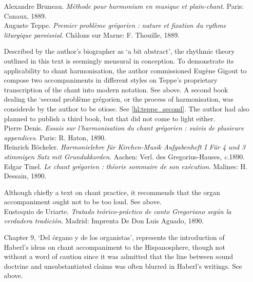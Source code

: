    \parindent=0pt
    \hangindent=0pt
  \covid{}Alexandre Bruneau. \emph{Méthode pour harmonium en musique et plain-chant}. Paris:  Canaux, 1889. \\

    \parindent=0pt
    \hangindent=0pt
  Auguste Teppe. \emph{Premier problème grégorien : nature et fixation du rythme liturgique paroissial}. Châlons sur Marne:  F. Thouille, 1889.

     \parindent=20pt
     \hangindent=20pt
     Described by the author's biographer as `a bit abstract', the rhythmic theory outlined in this text is seemingly mensural in conception. To demonstrate its applicability to chant harmonisation, the author commissioned Eugène Gigout to compose two accompaniments in different styles on Teppe's proprietary transcription of the chant into modern notation. See  above. A second book dealing the `second problème grégorien, or the process of harmonisation, was considerde by the author to be otiose. See \cref{hl:teppe_second}. The author had also planned to publish a third book, but that did not come to light either.\\

    \parindent=0pt
    \hangindent=0pt
  \covid{}Pierre Denis. \emph{Essais sur l'harmonisation du chant grégorien : suivis de plusieurs appendices}. Paris:  R. Haton, 1890. \\

    \parindent=0pt
    \hangindent=0pt
  \covid{}Heinrich Böckeler. \emph{Harmonielehre für Kirchen-Musik Aufgabenheft I Für 4 und 3 stimmigen Satz mit Grundakkorden}. Aachen:  Verl. des Gregorius-Hauses, \emph{c}.1890. \\

    \parindent=0pt
    \hangindent=0pt
  Edgar Tinel. \emph{Le chant grégorien : théorie sommaire de son exécution}. Malines:  H. Dessain, 1890.

     \parindent=20pt
     \hangindent=20pt
     Although chiefly a text on chant practice, it recommends that the organ accompaniment ought not to be too loud. See  above.\\

    \parindent=0pt
    \hangindent=0pt
  Eustoquio de Uriarte. \emph{Tratado teórico-práctico de canto Gregoriano según la verdadera tradición}. Madrid:  Imprenta De Don Luis Aguado, 1890.

     \parindent=20pt
     \hangindent=20pt
     Chapter 9, `Del órgano y de los organistas', represents the introduction of Haberl's ideas on chant accompaniment to the Hispanosphere, though not without a word of caution since it was admitted that the line between sound doctrine and unsubstantiated claims was often blurred in Haberl's writings. See  above.\\\pagebreak{}

